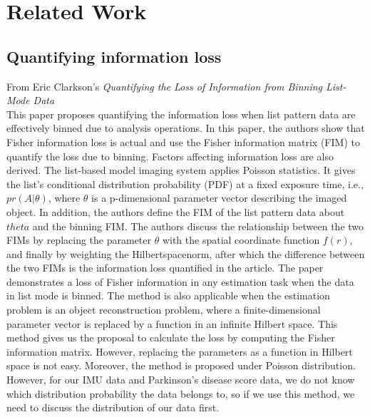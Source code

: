 \chapter{Related Work}

\section{Quantifying information loss}

From Eric Clarkson's \emph{Quantifying the Loss of Information from Binning List-Mode Data} \cite{2020} \\
This paper proposes quantifying the information loss when list pattern data are effectively binned due to analysis operations. In this paper, the authors show that Fisher information loss is actual and use the Fisher information matrix (FIM) to quantify the loss due to binning. Factors affecting information loss are also derived. The list-based model imaging system applies Poisson statistics. It gives the list's conditional distribution probability (PDF) at a fixed exposure time, i.e., $pr(A|\theta)$, where $\theta$ is a p-dimensional parameter vector describing the imaged object. In addition, the authors define the FIM of the list pattern data about $theta$ and the binning FIM. The authors discuss the relationship between the two FIMs by replacing the parameter $\theta$ with the spatial coordinate function $f(r)$, and finally by weighting the Hilbertspacenorm, after which the difference between the two FIMs is the information loss quantified in the article. The paper demonstrates a loss of Fisher information in any estimation task when the data in list mode is binned. The method is also applicable when the estimation problem is an object reconstruction problem, where a finite-dimensional parameter vector is replaced by a function in an infinite Hilbert space. This method gives us the proposal to calculate the loss by computing the Fisher information matrix. However, replacing the parameters as a function in Hilbert space is not easy. Moreover, the method is proposed under Poisson distribution. However, for our IMU data and Parkinson's disease score data, we do not know which distribution probability the data belongs to, so if we use this method, we need to discuss the distribution of our data first.

